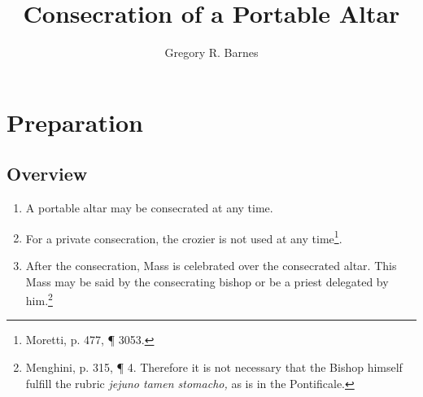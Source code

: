 \documentclass[twocolumn]{report}
\title{Consecration of a Portable Altar}
\author{Gregory R. Barnes}
\begin{document}
	\maketitle
\section*{Preparation}
\subsection*{Overview}
\begin{enumerate}
	\item A portable altar may be consecrated at any time.
	\item For a private consecration, the crozier is not used at any time\footnote{Moretti, p. 477, \P{} 3053.}.
	\item After the consecration, Mass is celebrated over the  consecrated altar. This Mass may be said by the consecrating bishop or be a priest delegated by him.\footnote{Menghini, p. 315, \P{} 4. Therefore it is not necessary that the Bishop himself fulfill the rubric \textit{jejuno tamen stomacho,} as is in the Pontificale.}
\end{enumerate}
\end{document}
